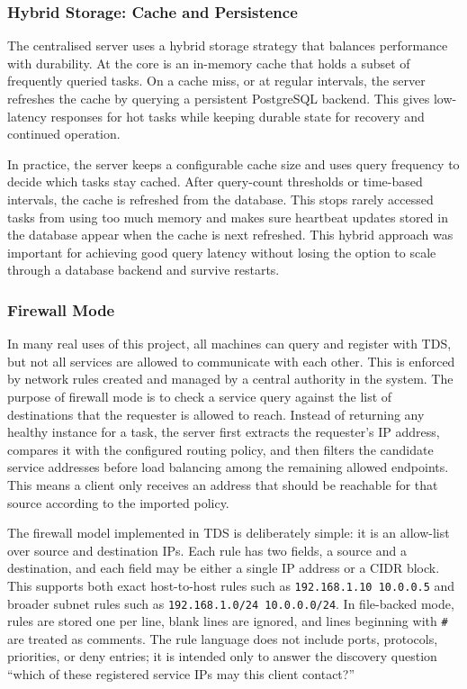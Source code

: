 \documentclass[10pt,a4paper]{article}
\begin{document}
\subsubsection{Hybrid Storage: Cache and Persistence}
The centralised server uses a hybrid storage strategy that balances performance with durability. At the core is an in-memory cache that holds a subset of frequently queried tasks. On a cache miss, or at regular intervals, the server refreshes the cache by querying a persistent PostgreSQL backend. This gives low-latency responses for hot tasks while keeping durable state for recovery and continued operation.

In practice, the server keeps a configurable cache size and uses query frequency to decide which tasks stay cached. After query-count thresholds or time-based intervals, the cache is refreshed from the database. This stops rarely accessed tasks from using too much memory and makes sure heartbeat updates stored in the database appear when the cache is next refreshed. This hybrid approach was important for achieving good query latency without losing the option to scale through a database backend and survive restarts.

\subsubsection{Firewall Mode}
In many real uses of this project, all machines can query and register with TDS, but not all services are allowed to communicate with each other. This is enforced by network rules created and managed by a central authority in the system.
The purpose of firewall mode is to check a service query against the list of destinations that the requester is allowed to reach. Instead of returning any healthy instance for a task, the server first extracts the requester's IP address, compares it with the configured routing policy, and then filters the candidate service addresses before load balancing among the remaining allowed endpoints. This means a client only receives an address that should be reachable for that source according to the imported policy.

The firewall model implemented in TDS is deliberately simple: it is an allow-list over source and destination IPs. Each rule has two fields, a source and a destination, and each field may be either a single IP address or a CIDR block. This supports both exact host-to-host rules such as \texttt{192.168.1.10 10.0.0.5} and broader subnet rules such as \texttt{192.168.1.0/24 10.0.0.0/24}. In file-backed mode, rules are stored one per line, blank lines are ignored, and lines beginning with \texttt{\#} are treated as comments. The rule language does not include ports, protocols, priorities, or deny entries; it is intended only to answer the discovery question ``which of these registered service IPs may this client contact?''
\end{document}
